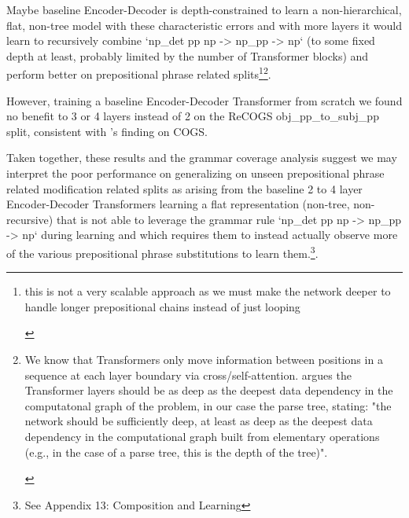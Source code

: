 \documentclass[11pt]{article}
\begin{document}
Maybe \cite{Wu2023} baseline Encoder-Decoder is depth-constrained to learn a non-hierarchical, flat, non-tree model with these characteristic errors and with more layers it would learn to recursively combine `np\_det pp np -> np\_pp -> np` (to some fixed depth at least, probably limited by the number of Transformer blocks) and perform better on prepositional phrase related splits\footnote{
\begin{tiny}
this is not a very scalable approach as we must make the network deeper to handle longer prepositional chains instead of just looping
\end{tiny}
}\footnote{
\begin{tiny}
We know that Transformers only move information between positions in a sequence at each layer boundary via cross/self-attention. \cite{Csordas2022} argues the Transformer layers should be as deep as the deepest data dependency in the computatonal graph of the problem, in our case the parse tree, stating: "the network should be sufficiently deep, at least as deep as the deepest data dependency in the computational graph built from elementary operations (e.g., in the case of a parse tree, this is the depth of the tree)".
\end{tiny}
}. 

However, training a \cite{Wu2023} baseline Encoder-Decoder Transformer from scratch we found no benefit to 3 or 4 layers instead of 2 on the ReCOGS obj\_pp\_to\_subj\_pp split, consistent with \cite{petty2024impactdepthcompositionalgeneralization}'s finding on COGS.

Taken together, these results and the grammar coverage analysis suggest we may interpret the poor performance on generalizing on unseen prepositional phrase related modification related splits as arising from the baseline 2 to 4 layer Encoder-Decoder Transformers learning a flat representation (non-tree, non-recursive) that is not able to leverage the grammar rule `np\_det pp np -> np\_pp -> np` during learning and which requires them to instead actually observe more of the various prepositional phrase substitutions to learn them.\footnote{See Appendix 13: Composition and Learning}.
\end{document}
